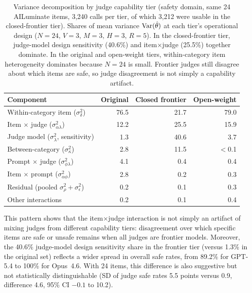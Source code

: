 \begin{table}[h]
\centering
\small
\caption{Variance decomposition by judge capability tier (safety domain, same 24 AILuminate items, 3,240 calls per tier, of which 3,212 were usable in the closed-frontier tier). Shares of mean variance $\operatorname{Var}(\hat\theta)$ at each tier's operational design ($N{=}24$, $V{=}3$, $M{=}3$, $H{=}3$, $R{=}5$). In the closed-frontier tier, judge-model design sensitivity (40.6\%) and item$\times$judge (25.5\%) together dominate. In the original and open-weight tiers, within-category item heterogeneity dominates because $N{=}24$ is small. Frontier judges still disagree about which items are safe, so judge disagreement is not simply a capability artifact.}
\label{tab:tier_sensitivity}
\begin{tabular}{lrrr}
\toprule
Component & Original & Closed frontier & Open-weight \\
\midrule
Within-category item ($\sigma^2_\delta$) & 76.5 & 21.7 & 79.0 \\
Item $\times$ judge ($\sigma^2_{\alpha\lambda}$) & 12.2 & 25.5 & 15.9 \\
Judge model ($\sigma^2_\lambda$, sensitivity) &  1.3 & 40.6 &  3.7 \\
Between-category ($\sigma^2_\kappa$) &  2.8 & 11.5 & $<$0.1 \\
Prompt $\times$ judge ($\sigma^2_{\phi\lambda}$) &  4.1 &  0.4 &  0.4 \\
Item $\times$ prompt ($\sigma^2_{\alpha\phi}$) &  2.8 &  0.2 &  0.3 \\
Residual (pooled $\sigma^2_\rho + \sigma^2_\epsilon$) &  0.2 &  0.1 &  0.3 \\
Other interactions         &  0.2 &  0.1 &  0.4 \\
\bottomrule
\end{tabular}
\end{table}

This pattern shows that the item$\times$judge interaction is not simply an artifact of mixing judges from different capability tiers: disagreement over which specific items are safe or unsafe remains when all judges are frontier models. Moreover, the 40.6\% judge-model design sensitivity share in the frontier tier (versus 1.3\% in the original set) reflects a wider spread in overall safe rates, from 89.2\% for GPT-5.4 to 100\% for Opus~4.6. With 24 items, this difference is also suggestive but not statistically distinguishable (SD of judge safe rates 5.5 points versus 0.9, difference 4.6, 95\% CI $-0.1$ to 10.2).

